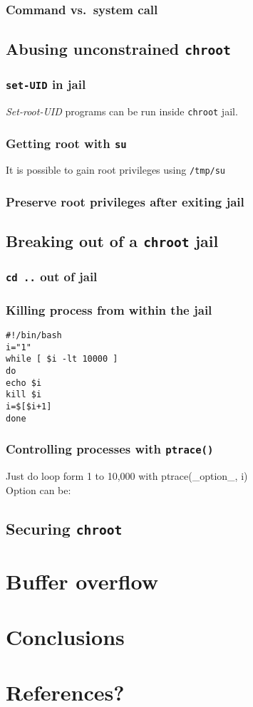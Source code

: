 \documentclass[12pt, a4paper, pdflatex]{article}
\begin{document}
\subsubsection{Command vs.\ system call}

\subsection{Abusing unconstrained \texttt{chroot}}
\subsubsection{\texttt{set-UID} in jail}
\emph{Set-root-UID} programs can be run inside \texttt{chroot} jail.

\subsubsection{Getting root with \texttt{su}}
It is possible to gain root privileges using \texttt{/tmp/su}

\subsubsection{Preserve root privileges after exiting jail}

\subsection{Breaking out of a \texttt{chroot} jail}
\subsubsection{\texttt{cd ..} out of jail}

\subsubsection{Killing process from within the jail}
\vspace{1em}
\lstset{
  captionpos=b,
  frame=single,
  language=bash,
  breaklines=true,
  caption=Kill processes outside of chroot jail.,
  label=chroot:kill
}
\begin{lstlisting}
#!/bin/bash
i="1"
while [ $i -lt 10000 ]
do
echo $i
kill $i
i=$[$i+1]
done
\end{lstlisting}

\subsubsection{Controlling processes with \texttt{ptrace()}}
Just do loop form 1 to 10,000 with ptrace(\_option\_, i)\\
Option can be: 

\subsection{Securing \texttt{chroot}}

\section{Buffer overflow}
\lipsum[3]

\section{Conclusions}

\section{References?}
\end{document}
